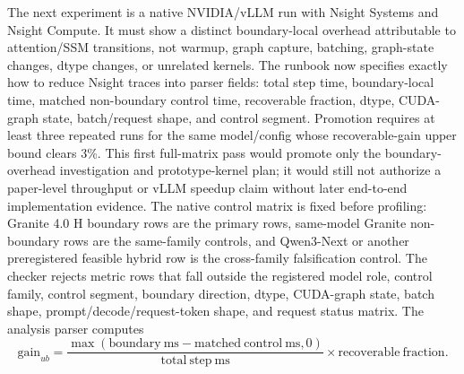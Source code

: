 \documentclass{article}
\begin{document}
The next experiment is a native NVIDIA/vLLM run with Nsight Systems and Nsight Compute. It must show a distinct boundary-local overhead attributable to attention/SSM transitions, not warmup, graph capture, batching, graph-state changes, dtype changes, or unrelated kernels. The runbook now specifies exactly how to reduce Nsight traces into parser fields: total step time, boundary-local time, matched non-boundary control time, recoverable fraction, dtype, CUDA-graph state, batch/request shape, and control segment. Promotion requires at least three repeated runs for the same model/config whose recoverable-gain upper bound clears 3\%. This first full-matrix pass would promote only the boundary-overhead investigation and prototype-kernel plan; it would still not authorize a paper-level throughput or vLLM speedup claim without later end-to-end implementation evidence. The native control matrix is fixed before profiling: Granite 4.0 H boundary rows are the primary rows, same-model Granite non-boundary rows are the same-family controls, and Qwen3-Next or another preregistered feasible hybrid row is the cross-family falsification control. The checker rejects metric rows that fall outside the registered model role, control family, control segment, boundary direction, dtype, CUDA-graph state, batch shape, prompt/decode/request-token shape, and request status matrix. The analysis parser computes
\[
\mathrm{gain}_{ub} =
\frac{\max(\mathrm{boundary\ ms}-\mathrm{matched\ control\ ms}, 0)}
{\mathrm{total\ step\ ms}}
\times \mathrm{recoverable\ fraction}.
\]
\end{document}
